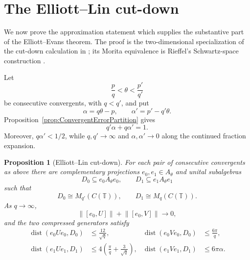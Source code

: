 \documentclass{book}
\newtheorem{proposition}[definition]{Proposition}
\begin{document}
\section{The Elliott--Lin cut-down}

We now prove the approximation statement which supplies the substantive
part of the Elliott--Evans theorem. The proof is the two-dimensional
specialization of the cut-down calculation in
\cite[pp.~122--130]{ElliottLin1996}; its Morita equivalence is Rieffel's
Schwartz-space construction \cite{Rieffel1988}.

Let
\[
  \frac pq<\theta<\frac{p'}{q'}
\]
be consecutive convergents, with \(q<q'\), and put
\[
  \alpha=q\theta-p,
  \qquad
  \alpha'=p'-q'\theta.
\]
Proposition~\ref{prop:ConvergentErrorPartition} gives
\begin{equation}\label{eq:ElliottLinPartition}
  q'\alpha+q\alpha'=1.
\end{equation}
Moreover, \(q\alpha'<1/2\), while \(q,q'\to\infty\) and
\(\alpha,\alpha'\to0\) along the continued fraction expansion.

\begin{proposition}[Elliott--Lin cut-down]
  \label{prop:ElliottLinCutDown}
  For each pair of consecutive convergents as above there are complementary
  projections \(e_0,e_1\in A_\theta\) and unital subalgebras
  \[
    D_0\subseteq e_0A_\theta e_0,
    \qquad
    D_1\subseteq e_1A_\theta e_1
  \]
  such that
  \[
    D_0\cong M_{q'}(C(\mathbb T)),
    \qquad
    D_1\cong M_q(C(\mathbb T)).
  \]
  As \(q\to\infty\),
  \[
    \lVert[e_0,U]\rVert+\lVert[e_0,V]\rVert\longrightarrow0,
  \]
  and the two compressed generators satisfy
  \begin{align}
    \operatorname{dist}(e_0Ue_0,D_0)&\leq\frac{12}{\sqrt q},
    &
    \operatorname{dist}(e_0Ve_0,D_0)&\leq\frac{6\pi}{q},
    \label{eq:ElliottLinFirstCorner}\\
    \operatorname{dist}(e_1Ue_1,D_1)
      &\leq4\left(\frac\pi q+\frac3{\sqrt q}\right),
    &
    \operatorname{dist}(e_1Ve_1,D_1)&\leq6\pi\alpha.
    \label{eq:ElliottLinSecondCorner}
  \end{align}
\end{proposition}
\end{document}
